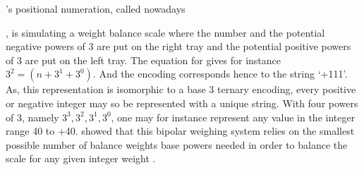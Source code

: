 \documentclass[a4paper,12pt,english]{sphinxhowto}
\begin{document}
\sphinxAtStartPar
{}’s positional  numeration, called nowadays  %
\begin{footnote}[25]\sphinxAtStartFootnote
{}
%
\end{footnote} , is simulating a weight balance scale where the number  and the potential negative powers of 3 are put on the right tray and the potential positive powers of 3 are put on the left tray. The equation for  gives for instance \(3^2 = (n + 3^1 + 3^0)\). And the  encoding corresponds hence to the string ‘+1\sphinxhyphen{}1\sphinxhyphen{}1’. As, this representation is isomorphic to a base 3 ternary encoding, every positive or negative integer may so be represented with a unique  string. With four powers of 3, namely \({3^3, 3^2, 3^1, 3^0}\), one may for instance represent any value in the integer range \sphinxhyphen{}40 to +40.  showed that this bipolar weighing system relies on the smallest possible number of balance weights \sphinxhyphen{}base powers\sphinxhyphen{} needed in order to balance the scale for any given integer weight  .
\end{document}

